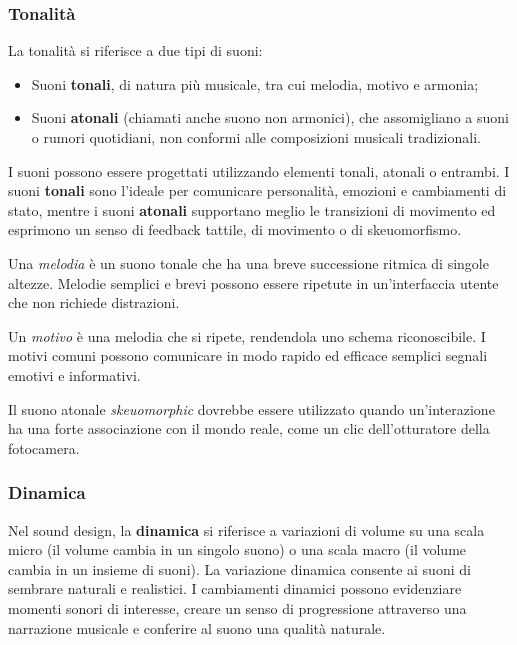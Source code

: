 \documentclass[12pt, a4paper]{report}
\begin{document}
                  \subsubsection{Tonalità}
                    La tonalità si riferisce a due tipi di suoni:
                    \begin{itemize}
                        \item Suoni \textbf{tonali}, di natura più musicale, tra cui melodia, motivo e armonia;
                        \item Suoni \textbf{atonali} (chiamati anche suono non armonici), che assomigliano a suoni o rumori quotidiani, non conformi alle composizioni musicali tradizionali.
                    \end{itemize}
                    I suoni possono essere progettati utilizzando elementi tonali, atonali o entrambi. I suoni \textbf{tonali} sono l’ideale per comunicare personalità, emozioni e cambiamenti
                    di stato, mentre i suoni \textbf{atonali} supportano meglio le transizioni di movimento ed esprimono un senso di feedback tattile, di movimento o di skeuomorfismo.

                    Una \textit{melodia} è un suono tonale che ha una breve successione ritmica di singole altezze. Melodie semplici e brevi possono essere ripetute in un'interfaccia utente che non richiede distrazioni.

                    Un \textit{motivo} è una melodia che si ripete, rendendola uno schema riconoscibile. I motivi comuni possono comunicare in modo rapido ed efficace semplici segnali emotivi e informativi.

                    Il suono atonale \textit{skeuomorphic} dovrebbe essere utilizzato quando un'interazione ha una forte associazione con il mondo reale, come un clic dell'otturatore della fotocamera.


                    \subsubsection{Dinamica}
                    Nel sound design, la \textbf{dinamica} si riferisce a variazioni di volume su una scala micro (il volume cambia in un singolo suono) o una scala macro (il volume cambia in un insieme
                    di suoni). La variazione dinamica consente ai suoni di sembrare naturali e realistici. I cambiamenti dinamici possono evidenziare momenti sonori di interesse, creare un senso
                    di progressione attraverso una narrazione musicale e conferire al suono una qualità naturale.
\end{document}
